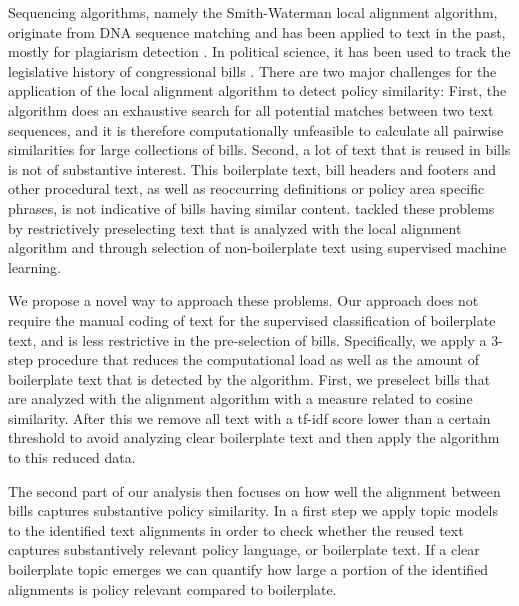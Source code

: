 \documentclass[12pt]{article} %
\begin{document}
Sequencing algorithms, namely the Smith-Waterman local alignment algorithm, originate from DNA sequence matching and has been applied to text in the past, mostly for plagiarism detection \citep{su2008plagiarism, irving2008plagiarism}. In political science, it has been used to track the legislative history of congressional bills \citep{wilkerson2015tracing}. There are two major challenges for the application of the local alignment algorithm to detect policy similarity: First, the algorithm does an exhaustive search for all potential matches between two text sequences, and it is therefore computationally unfeasible to calculate all pairwise similarities for large collections of bills. Second, a lot of text that is reused in bills is not of substantive interest. This boilerplate text, bill headers and footers and other procedural text, as well as reoccurring definitions or policy area specific phrases, is not indicative of bills having similar content. \citet{wilkerson2015tracing} tackled these problems by restrictively preselecting text that is analyzed with the local alignment algorithm and through selection of non-boilerplate text using supervised machine learning. 

We propose a novel way to approach these problems. Our approach does not require the manual coding of text for the supervised classification of boilerplate text, and is less restrictive in the pre-selection of bills. Specifically, we apply a 3-step procedure that reduces the computational load as well as the amount of boilerplate text that is detected by the algorithm. First, we preselect bills that are analyzed with the alignment algorithm with a measure related to cosine similarity. After this we remove all text with a tf-idf score lower than a certain threshold to avoid analyzing clear boilerplate text and then apply the algorithm to this reduced data.

The second part of our analysis then focuses on how well the alignment between bills captures substantive policy similarity. In a first step we apply topic models to the identified text alignments in order to check whether the reused text captures substantively relevant policy language, or boilerplate text. If a clear boilerplate topic emerges we can quantify how large a portion of the identified alignments is policy relevant compared to boilerplate.
\end{document}
